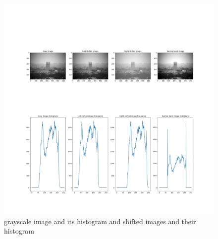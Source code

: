 \documentclass{article}
\begin{document}
{{        \begin{figure}[htp]
            \centering
            \includegraphics[width=1.0\textwidth]{Assignment-7/fig-1.jpg}
            \caption{grayscale image and its histogram and shifted images and their histogram}
        \end{figure}
    }
}
\clearpage
\end{document}
